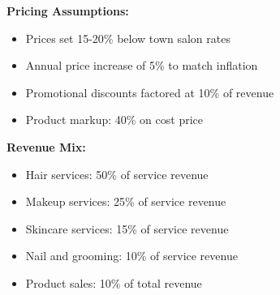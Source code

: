 \documentclass[a4paper,12pt]{article}
\begin{document}
\textbf{Pricing Assumptions:}
\begin{itemize}[leftmargin=2em]
    \item Prices set 15-20\% below town salon rates
    \item Annual price increase of 5\% to match inflation
    \item Promotional discounts factored at 10\% of revenue
    \item Product markup: 40\% on cost price
\end{itemize}

\textbf{Revenue Mix:}
\begin{itemize}[leftmargin=2em]
    \item Hair services: 50\% of service revenue
    \item Makeup services: 25\% of service revenue
    \item Skincare services: 15\% of service revenue
    \item Nail and grooming: 10\% of service revenue
    \item Product sales: 10\% of total revenue
\end{itemize}

\vspace{1em}
\end{document}
